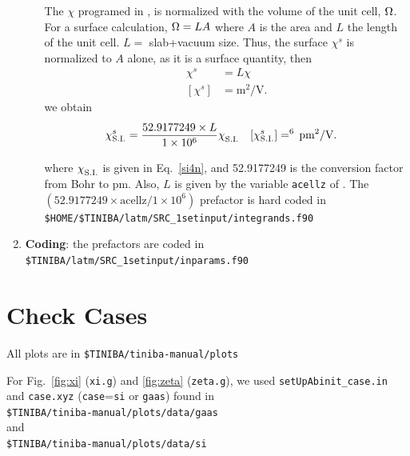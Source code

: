 \documentclass[12pt]{article}
\numberwithin{equation}{section}
\begin{document}
\begin{enumerate}
\begin{enumerate}
The $\chi$ programed in \tiniba, is normalized with the volume of the
unit cell, $\Omega$. For a surface calculation, $\Omega=LA$ where $A$ is the
area and $L$ the length of the unit cell. $L=$ slab+vacuum
size. Thus, the surface $\chi^s$ is normalized to $A$ alone, as it is
a surface quantity, then
\begin{align}\label{u.30}
\chi^s&=L\chi 
\\
[\chi^s]&=\text{m}^2/\text{V}
.
\end{align}
we obtain
\begin{align}\label{si14n}
\chi^s_{\mathrm{S.I.}}
&=\frac{52.9177249\times L}{1\times 10^6}
\chi^{\strut}_{\mathrm{S.I.}}
\quad[\chi^s_{\mathrm{S.I.}}]=\time 10^6\,\text{pm}^2/\text{V}. 
\end{align}
where $\chi^{\strut}_{\mathrm{S.I.}}$ is given in Eq.~\eqref{si4n}, and 
52.9177249
is the conversion factor from Bohr to pm. 
Also, $L$ is given by the variable 
\verb=acellz= of \tiniba. The 
$(52.9177249\times \text{acellz}/1\times 10^6)$ prefactor is hard coded in
\verb=$HOME/$TINIBA/latm/SRC_1setinput/integrands.f90=

\end{enumerate}


\item {\bf Coding}: the prefactors are coded in\\  
 \verb=$TINIBA/latm/SRC_1setinput/inparams.f90=

\end{enumerate}

\section{Check Cases}

All plots are in
\verb=$TINIBA/tiniba-manual/plots=

For Fig.~\ref{fig:xi} (\verb=xi.g=) and \ref{fig:zeta}
(\verb=zeta.g=), 
we used
\verb=setUpAbinit_case.in= and \verb=case.xyz= 
(\verb=case==\verb=si= or \verb=gaas=)
found in
\\
\verb=$TINIBA/tiniba-manual/plots/data/gaas=\\ 
and\\
\verb=$TINIBA/tiniba-manual/plots/data/si=\\
\end{document}
